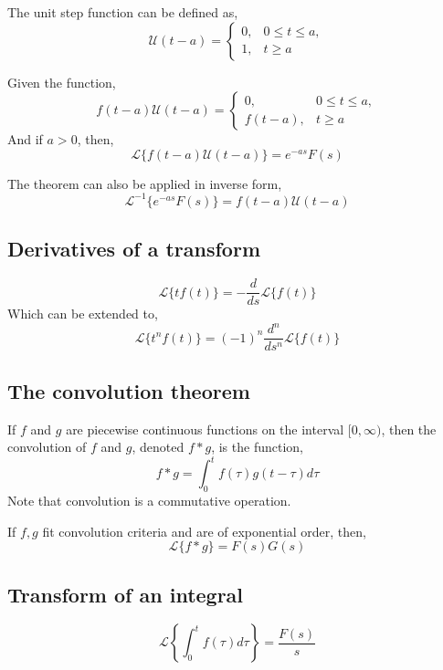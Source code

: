 The unit step function can be defined as,
\[
    \mathscr{U}(t - a) = \begin{cases}
        0, & 0 \leq t \leq a, \\
        1, & t \geq a
    \end{cases}
\]

\begin{theorem}
    Given the function,
    \[
        f(t - a)\mathscr{U}(t - a) = \begin{cases}
            0, & 0 \leq t \leq a, \\
            f(t - a), & t \geq a
        \end{cases}
    \]
    And if $a > 0$, then,
    \[
        \mathscr{L}\{f(t - a)\mathscr{U}(t - a)\} = e^{-as}F(s)
    \]
\end{theorem}

The theorem can also be applied in inverse form,
\[
    \mathscr{L}^{-1}\{e^{-as}F(s)\} = f(t - a)\mathscr{U}(t - a)
\]

\subsection{Derivatives of a transform}

\[
    \mathscr{L}\{tf(t)\} = -\frac{d}{ds} \mathscr{L}\{f(t)\}
\]
Which can be extended to,
\[
    \mathscr{L}\{t^n f(t)\} = (-1)^n \frac{d^n}{ds^n} \mathscr{L}\{f(t)\}
\]

\subsection{The convolution theorem}

If $f$ and $g$ are piecewise continuous functions on the interval $[0,\infty)$, then the convolution of $f$ and $g$, denoted $f * g$, is the function,
\[
    f * g = \int_0^t f(\tau) g(t - \tau) d\tau
\]
Note that convolution is a commutative operation.

\begin{theorem}
    If $f,g$ fit convolution criteria and are of exponential order, then,
    \[
        \mathscr{L}\{f * g\} = F(s)G(s)
    \]
\end{theorem}

\subsection{Transform of an integral}

\[
    \mathscr{L}\left\{ \int_0^t f(\tau) d\tau \right\} = \frac{F(s)}{s}
\]

